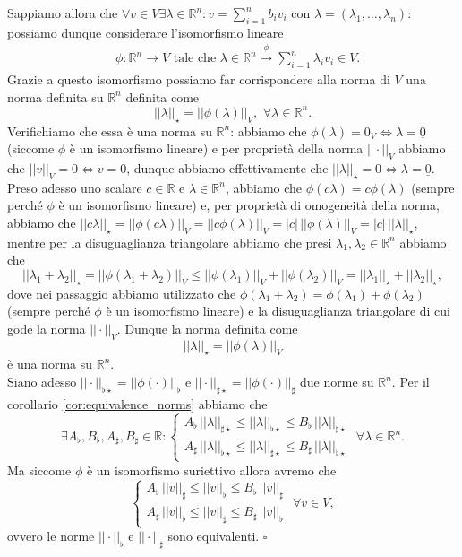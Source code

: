     Sappiamo allora che $\forall v \in V \exists \lambda \in \mathbb{R}^n : v = \sum_{i=1}^n b_i v_i$ con $\lambda = (\lambda_1, \ldots, \lambda_n)$: possiamo dunque considerare l'isomorfismo lineare
    \[\begin{aligned}
        &\phi: \mathbb{R}^n \to V \, \, \text{tale che} \, \, \lambda \in \mathbb{R}^n \stackrel{\phi}{\mapsto} \sum_{i=1}^n \lambda_i v_i \in V.
    \end{aligned}\]
    Grazie a questo isomorfismo possiamo far corrispondere alla norma di $V$ una norma definita su $\mathbb{R}^n$ definita come
    \[
    ||\lambda||_{\star} = ||\phi(\lambda)||_V, \, \, \forall \lambda \in \mathbb{R}^n.
    \]
    Verifichiamo che essa è una norma su $\mathbb{R}^n$: abbiamo che $\phi(\lambda) = 0_V \iff \lambda = \underline{0}$ (siccome $\phi$ è un isomorfismo lineare) e per proprietà della norma $||\cdot||_V$ abbiamo che $||v||_V = 0 \iff v = 0$, dunque abbiamo effettivamente che $||\lambda||_{\star} = 0 \iff \lambda = \underline{0}$. Preso adesso uno scalare $c \in \mathbb{R}$ e $\lambda \in \mathbb{R}^n$, abbiamo che
    $\phi(c\lambda) = c\phi(\lambda)$ (sempre perché $\phi$ è un isomorfismo lineare) e, per proprietà di omogeneità della norma, abbiamo che $||c\lambda||_{\star} = ||\phi(c\lambda)||_V = ||c \phi(\lambda) ||_V = |c| \, ||\phi(\lambda)||_V = |c| \, ||\lambda||_{\star}$, mentre per la disuguaglianza triangolare abbiamo che presi $\lambda_1, \lambda_2 \in \mathbb{R}^n$ abbiamo che
    \[
        ||\lambda_1 + \lambda_2||_{\star} = ||\phi(\lambda_1 + \lambda_2)||_V \leq ||\phi(\lambda_1)||_V + ||\phi(\lambda_2)||_V = ||\lambda_1||_{\star} + ||\lambda_2||_{\star},
    \]
    dove nei passaggio abbiamo utilizzato che $\phi(\lambda_1 + \lambda_2) = \phi(\lambda_1) + \phi(\lambda_2)$ (sempre perché $\phi$ è un isomorfismo lineare) e la disuguaglianza triangolare di cui gode la norma $||\cdot||_V$. Dunque la norma definita come
    \[
        ||\lambda||_{\star} = ||\phi(\lambda)||_V
    \]
    è una norma su $\mathbb{R}^n$. \\
    Siano adesso $||\cdot||_{\flat\star} = ||\phi(\cdot)||_{\flat}$ e $||\cdot||_{\sharp\star} = ||\phi(\cdot)||_{\sharp}$ due norme su $\mathbb{R}^n$. Per il corollario \ref{cor:equivalence_norms} abbiamo che
    \[
    \exists A_\flat, B_\flat, A_\sharp, B_\sharp \in \mathbb{R} : \begin{cases}
        A_\flat \, ||\lambda||_{\sharp\star} \leq ||\lambda||_{\flat\star} \leq B_\flat \, ||\lambda||_{\sharp\star} \\
        A_\sharp \, ||\lambda||_{\flat\star} \leq ||\lambda||_{\sharp\star} \leq B_\sharp \, ||\lambda||_{\flat\star}
    \end{cases} \, \, \forall \lambda \in \mathbb{R}^n.
    \]
    Ma siccome $\phi$ è un isomorfismo suriettivo allora avremo che
    \[
    \begin{cases}
        A_\flat \, ||v||_{\sharp} \leq ||v||_{\flat} \leq B_\flat \, ||v||_{\sharp} \\
        A_\sharp \, ||v||_{\flat} \leq ||v||_{\sharp} \leq B_\sharp \, ||v||_{\flat}
    \end{cases} \, \, \forall v \in V,
    \]
    ovvero le norme $||\cdot||_{\flat}$ e $||\cdot||_{\sharp}$ sono equivalenti.
\hfill $\square$
%
\vspace{0.5cm}
